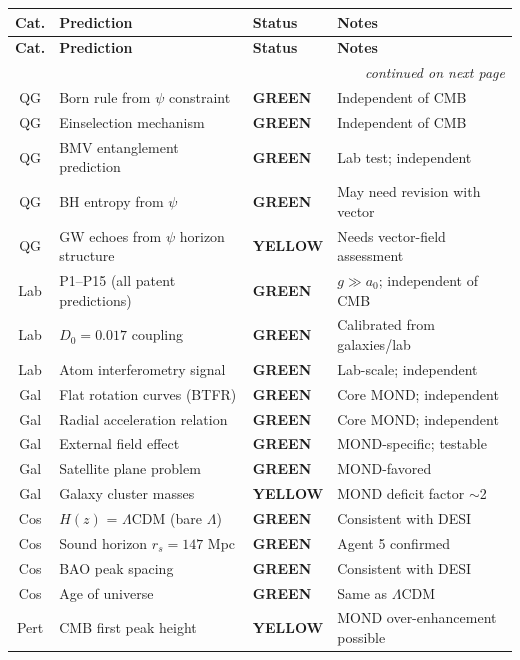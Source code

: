 \documentclass[11pt,a4paper]{article}
\newcommand{\GREEN}{\textcolor{dfdgreen}{\textbf{GREEN}}}
\newcommand{\YELLOW}{\textcolor{dfdyellow}{\textbf{YELLOW}}}
\begin{document}
\begin{longtable}{clll}
\toprule
\textbf{Cat.} & \textbf{Prediction} & \textbf{Status} & \textbf{Notes} \\
\midrule
\endfirsthead
\midrule
\textbf{Cat.} & \textbf{Prediction} & \textbf{Status} & \textbf{Notes} \\
\midrule
\endhead
\midrule
\multicolumn{4}{r}{\textit{continued on next page}} \\
\endfoot
\bottomrule
\endlastfoot
QG & Born rule from $\psi$ constraint & \GREEN & Independent of CMB \\
QG & Einselection mechanism & \GREEN & Independent of CMB \\
QG & BMV entanglement prediction & \GREEN & Lab test; independent \\
QG & BH entropy from $\psi$ & \GREEN & May need revision with vector \\
QG & GW echoes from $\psi$ horizon structure & \YELLOW & Needs vector-field assessment \\
\midrule
Lab & P1--P15 (all patent predictions) & \GREEN & $g \gg a_0$; independent of CMB \\
Lab & $D_0 = 0.017$ coupling & \GREEN & Calibrated from galaxies/lab \\
Lab & Atom interferometry signal & \GREEN & Lab-scale; independent \\
\midrule
Gal & Flat rotation curves (BTFR) & \GREEN & Core MOND; independent \\
Gal & Radial acceleration relation & \GREEN & Core MOND; independent \\
Gal & External field effect & \GREEN & MOND-specific; testable \\
Gal & Satellite plane problem & \GREEN & MOND-favored \\
Gal & Galaxy cluster masses & \YELLOW & MOND deficit factor $\sim$2 \\
\midrule
Cos & $H(z)$ = $\Lambda$CDM (bare $\Lambda$) & \GREEN & Consistent with DESI \\
Cos & Sound horizon $r_s = 147$ Mpc & \GREEN & Agent 5 confirmed \\
Cos & BAO peak spacing & \GREEN & Consistent with DESI \\
Cos & Age of universe & \GREEN & Same as $\Lambda$CDM \\
\midrule
Pert & CMB first peak height & \YELLOW & MOND over-enhancement possible \\

\end{longtable}
\end{document}
